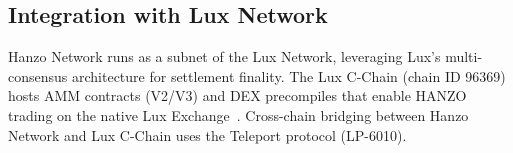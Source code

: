 \subsection{Integration with Lux Network}

Hanzo Network runs as a subnet of the Lux Network, leveraging Lux's
multi-consensus architecture for settlement finality. The Lux C-Chain (chain ID
96369) hosts AMM contracts (V2/V3) and DEX precompiles that enable HANZO trading
on the native Lux Exchange~\cite{luxwhitepaper}. Cross-chain bridging between
Hanzo Network and Lux C-Chain uses the Teleport protocol (LP-6010).

